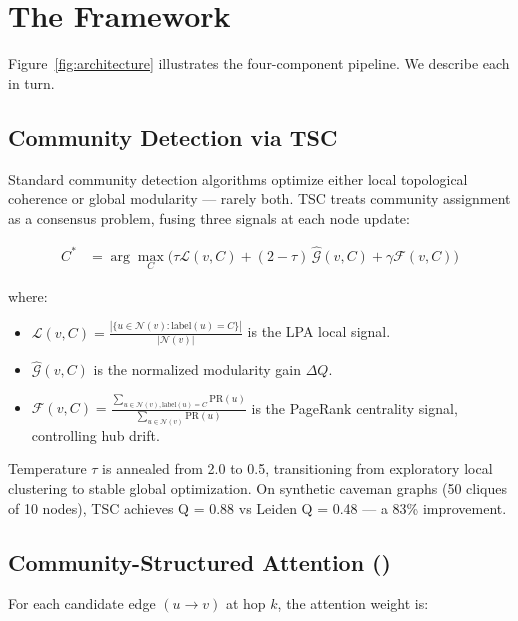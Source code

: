\documentclass[10pt,twocolumn]{article}
\begin{document}
\section{The \CEREBRUM{} Framework}
\label{sec:framework}

Figure~\ref{fig:architecture} illustrates the four-component pipeline. We describe each
in turn.

\subsection{Community Detection via TSC}
\label{sec:tsc}

Standard community detection algorithms optimize either local topological coherence or
global modularity — rarely both. TSC treats community assignment as a consensus problem,
fusing three signals at each node update:

\begin{align}
C^* &= \arg\max_{C} \bigl( \tau \mathcal{L}(v,C)
       + (2{-}\tau)\,\widehat{\mathcal{G}}(v,C)
       + \gamma \mathcal{F}(v,C) \bigr)
\label{eq:tsc}
\end{align}

where:
\begin{itemize}
  \item $\mathcal{L}(v,C) = \frac{|\{u \in \mathcal{N}(v): \mathrm{label}(u)=C\}|}{|\mathcal{N}(v)|}$
        is the LPA local signal.
  \item $\widehat{\mathcal{G}}(v,C)$ is the normalized modularity gain $\Delta Q$.
  \item $\mathcal{F}(v,C) = \frac{\sum_{u \in \mathcal{N}(v), \mathrm{label}(u)=C} \mathrm{PR}(u)}{\sum_{u \in \mathcal{N}(v)} \mathrm{PR}(u)}$
        is the PageRank centrality signal, controlling hub drift.
\end{itemize}

Temperature $\tau$ is annealed from 2.0 to 0.5, transitioning from exploratory local
clustering to stable global optimization. On synthetic caveman graphs (50 cliques of 10
nodes), TSC achieves Q = 0.88 vs Leiden Q = 0.48 — a 83\% improvement.

\subsection{Community-Structured Attention (\CSA{})}
\label{sec:csa}

For each candidate edge $(u \to v)$ at hop $k$, the attention weight is:
\end{document}
